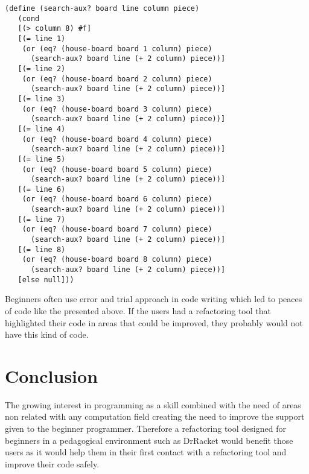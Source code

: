 \begin{lstlisting}[basicstyle=\ttfamily]
  (define (search-aux? board line column piece)
   (cond
   [(> column 8) #f]
   [(= line 1)
    (or (eq? (house-board board 1 column) piece)
      (search-aux? board line (+ 2 column) piece))]
   [(= line 2)
    (or (eq? (house-board board 2 column) piece)
      (search-aux? board line (+ 2 column) piece))]
   [(= line 3)
    (or (eq? (house-board board 3 column) piece)
      (search-aux? board line (+ 2 column) piece))]
   [(= line 4)
    (or (eq? (house-board board 4 column) piece)
      (search-aux? board line (+ 2 column) piece))]
   [(= line 5)
    (or (eq? (house-board board 5 column) piece)
      (search-aux? board line (+ 2 column) piece))]
   [(= line 6)
    (or (eq? (house-board board 6 column) piece)
      (search-aux? board line (+ 2 column) piece))]
   [(= line 7)
    (or (eq? (house-board board 7 column) piece)
      (search-aux? board line (+ 2 column) piece))]
   [(= line 8)
    (or (eq? (house-board board 8 column) piece)
      (search-aux? board line (+ 2 column) piece))]
   [else null]))
\end{lstlisting}







Beginners often use error and trial approach in code writing which led %
to peaces of code like the presented above.
If the users had a refactoring tool that highlighted their code in areas that
could be improved, they probably would not have this kind of code.


\section{Conclusion}



The growing interest in programming as a skill combined with the need of areas
non related with any computation field creating the need to improve the support
given to the beginner programmer. %
Therefore a refactoring tool designed for beginners in a pedagogical environment such as DrRacket %
 would benefit those users as it would help them in their first contact with a
 refactoring tool and improve their code safely. %

